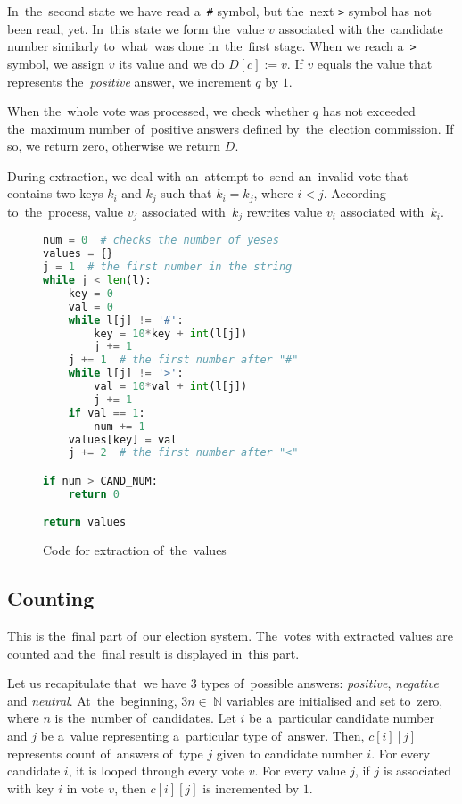 In~the~second state we have read a~\texttt{\#} symbol, but the~next \texttt{>} symbol has not been read, yet. In~this state we form the~value $v$ associated with the~candidate number similarly to~what~was done in~the~first stage. When we reach a~\texttt{>} symbol, we assign $v$ its value and we do  $D[c]:=v$. If $v$ equals the value that represents the~\emph{positive} answer, we increment $q$ by $1$.

When the~whole vote was processed, we check whether $q$ has not exceeded the~maximum number of~positive answers defined by~the~election commission. If so, we return zero, otherwise we return $D$.

During extraction, we deal with an~attempt to~send an~invalid vote that contains two keys $k_i$ and $k_j$ such that $k_i = k_j$, where $i < j$. According to~the~process, value $v_j$ associated with~$k_j$ rewrites value $v_i$ associated with~$k_i$.

\begin{figure}[h]
\begin{lstlisting}[language=Python]
num = 0  # checks the number of yeses
values = {}
j = 1  # the first number in the string
while j < len(l):
    key = 0
    val = 0
    while l[j] != '#':
        key = 10*key + int(l[j])
        j += 1
    j += 1  # the first number after "#"
    while l[j] != '>':
        val = 10*val + int(l[j])
        j += 1
    if val == 1:
        num += 1
    values[key] = val
    j += 2  # the first number after "<"

if num > CAND_NUM:
    return 0

return values
\end{lstlisting}
 \caption{Code for extraction of~the~values}
 \end{figure}   

\subsection{Counting}
This is the~final part of~our election system. The~votes with extracted values are counted and the~final result is displayed in~this part.

Let us recapitulate that~we have $3$ types of~possible answers: \emph{positive}, \emph{negative} and \emph{neutral}. At~the~beginning, $3n \in~\mathbb{N}$ variables are initialised and set to~zero, where $n$ is the~number of~candidates. Let $i$ be a~particular candidate number and $j$ be a~value representing a~particular type of~answer. Then, $c[i][j]$ represents count of~answers of~type $j$ given to candidate number $i$. %
For every candidate $i$, it is looped through every vote $v$. For every value $j$, if $j$ is associated with key $i$ in vote $v$, then $c[i][j]$ is incremented by $1$.

